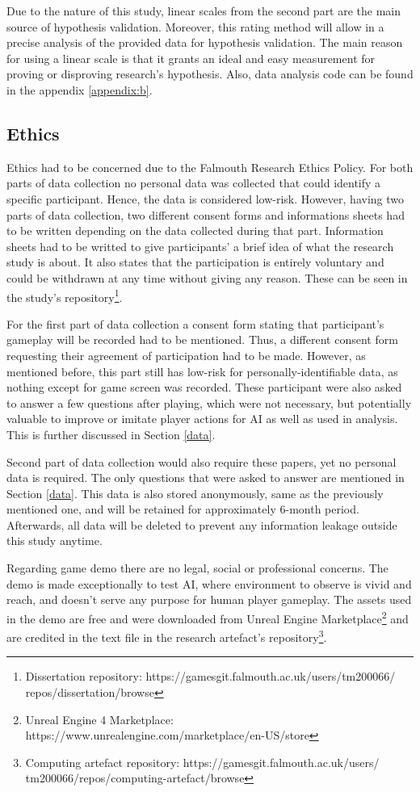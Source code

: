 \documentclass[journal]{IEEEtran}
\begin{document}
Due to the nature of this study, linear scales from the second part are the main source of hypothesis validation. Moreover, this rating method will allow in a precise analysis of the provided data for hypothesis validation. The main reason for using a linear scale is that it grants an ideal and easy measurement for proving or disproving research's hypothesis. Also, data analysis code can be found in the appendix \ref{appendix:b}.

\subsection{Ethics}
Ethics had to be concerned due to the Falmouth Research Ethics Policy. For both parts of data collection no personal data was collected that could identify a specific participant. Hence, the data is considered low-risk. However, having two parts of data collection, two different consent forms and informations sheets had to be written depending on the data collected during that part. Information sheets had to be writted to give participants' a brief idea of what the research study is about. It also states that the participation is entirely voluntary and could be withdrawn at any time without giving any reason. These can be seen in the study's repository\footnote{\label{dissertation}Dissertation repository: https://gamesgit.falmouth.ac.uk/users/tm200066/ repos/dissertation/browse}.

For the first part of data collection a consent form stating that participant's gameplay will be recorded had to be mentioned. Thus, a different consent form requesting their agreement of participation had to be made. However, as mentioned before, this part still has low-risk for personally-identifiable data, as nothing except for game screen was recorded. These participant were also asked to answer a few questions after playing, which were not necessary, but potentially valuable to improve or imitate player actions for AI as well as used in analysis. This is further discussed in Section \ref{data}.

Second part of data collection would also require these papers, yet no personal data is required. The only questions that were asked to answer are mentioned in Section \ref{data}. This data is also stored anonymously, same as the previously mentioned one, and will be retained for approximately 6-month period. Afterwards, all data will be deleted to prevent any information leakage outside this study anytime.

Regarding game demo there are no legal, social or professional concerns. The demo is made exceptionally to test AI, where environment to observe is vivid and reach, and doesn't serve any purpose for human player gameplay. The assets used in the demo are free and were downloaded from Unreal Engine Marketplace\footnote{\label{marketplace}Unreal Engine 4 Marketplace: https://www.unrealengine.com/marketplace/en-US/store} and are credited in the text file in the research artefact's repository\footnote{\label{artefact}Computing artefact repository: https://gamesgit.falmouth.ac.uk/users/ tm200066/repos/computing-artefact/browse}. %
\end{document}
